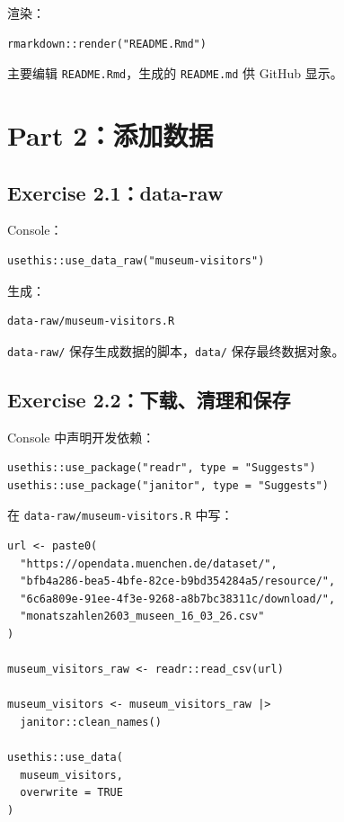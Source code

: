 \documentclass[11pt,a4paper]{ctexart}
\begin{document}
渲染：

\begin{lstlisting}
rmarkdown::render("README.Rmd")
\end{lstlisting}

主要编辑 \texttt{README.Rmd}，生成的 \texttt{README.md} 供 GitHub 显示。

\section{Part 2：添加数据}

\subsection{Exercise 2.1：data-raw}

Console：

\begin{lstlisting}
usethis::use_data_raw("museum-visitors")
\end{lstlisting}

生成：

\begin{verbatim}
data-raw/museum-visitors.R
\end{verbatim}

\texttt{data-raw/} 保存生成数据的脚本，\texttt{data/} 保存最终数据对象。

\subsection{Exercise 2.2：下载、清理和保存}

Console 中声明开发依赖：

\begin{lstlisting}
usethis::use_package("readr", type = "Suggests")
usethis::use_package("janitor", type = "Suggests")
\end{lstlisting}

在 \texttt{data-raw/museum-visitors.R} 中写：

\begin{lstlisting}
url <- paste0(
  "https://opendata.muenchen.de/dataset/",
  "bfb4a286-bea5-4bfe-82ce-b9bd354284a5/resource/",
  "6c6a809e-91ee-4f3e-9268-a8b7bc38311c/download/",
  "monatszahlen2603_museen_16_03_26.csv"
)

museum_visitors_raw <- readr::read_csv(url)

museum_visitors <- museum_visitors_raw |>
  janitor::clean_names()

usethis::use_data(
  museum_visitors,
  overwrite = TRUE
)
\end{lstlisting}
\end{document}

